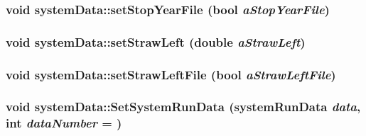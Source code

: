 \label{classsystem_data_a603a6ff137421abe95aba9b553103235}
\hypertarget{classsystem_data_a2428cc009cdc3ff84b3e0282fa11e5d9}{
\subsubsection[{setStopYearFile}]{\setlength{\rightskip}{0pt plus 5cm}void systemData::setStopYearFile (bool {\em aStopYearFile})}}
\label{classsystem_data_a2428cc009cdc3ff84b3e0282fa11e5d9}
\hypertarget{classsystem_data_a650b605bf9fee9cca05fa3e7bbf55b62}{
\subsubsection[{setStrawLeft}]{\setlength{\rightskip}{0pt plus 5cm}void systemData::setStrawLeft (double {\em aStrawLeft})}}
\label{classsystem_data_a650b605bf9fee9cca05fa3e7bbf55b62}
\hypertarget{classsystem_data_ad1d266f2b2f0c63142618a32b81ab04b}{
\subsubsection[{setStrawLeftFile}]{\setlength{\rightskip}{0pt plus 5cm}void systemData::setStrawLeftFile (bool {\em aStrawLeftFile})}}
\label{classsystem_data_ad1d266f2b2f0c63142618a32b81ab04b}
\hypertarget{classsystem_data_af821210ac898dc8db3d28214798a7aa0}{
\subsubsection[{SetSystemRunData}]{\setlength{\rightskip}{0pt plus 5cm}void systemData::SetSystemRunData ({\bf systemRunData} {\em data}, \/  int {\em dataNumber} = {})}}
\label{classsystem_data_af821210ac898dc8db3d28214798a7aa0}
